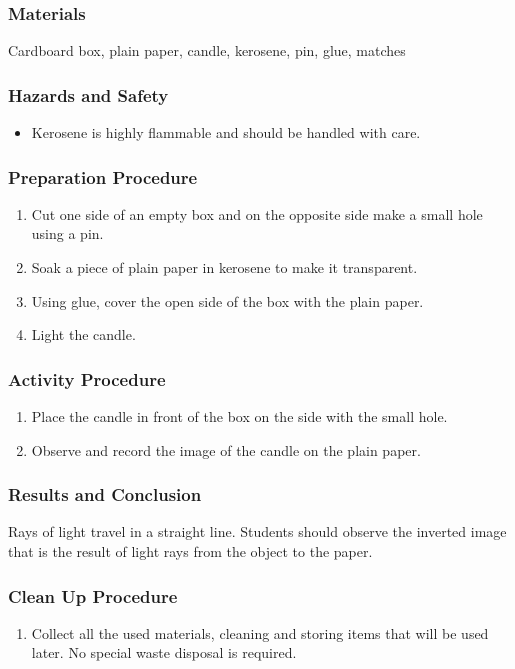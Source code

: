\subsubsection*{Materials}
Cardboard box, plain paper, candle, kerosene, pin, glue, matches

\subsubsection*{Hazards and Safety}
\begin{itemize}
\item{Kerosene is highly flammable and should be handled with care.} 
\end{itemize}

\subsubsection*{Preparation Procedure}
\begin{enumerate}
\item{Cut one side of an empty box and on the opposite side make a small hole using a pin.} 
\item{Soak a piece of plain paper in kerosene to make it transparent.} 
\item{Using glue, cover the open side of the box with the plain paper.} 
\item{Light the candle.} 
\end{enumerate}

\subsubsection*{Activity Procedure}
\begin{enumerate}
\item{Place the candle in front of the box on the side with the small hole.} 
\item{Observe and record the image of the candle on the plain paper.} 
\end{enumerate}

\subsubsection*{Results and Conclusion}
Rays of light travel in a straight line. Students should observe the inverted image that is the result of light rays from the object to the paper.  

\subsubsection*{Clean Up Procedure}
\begin{enumerate}
\item{Collect all the used materials, cleaning and storing items that will be used later. No special waste disposal is required.} 
\end{enumerate}

